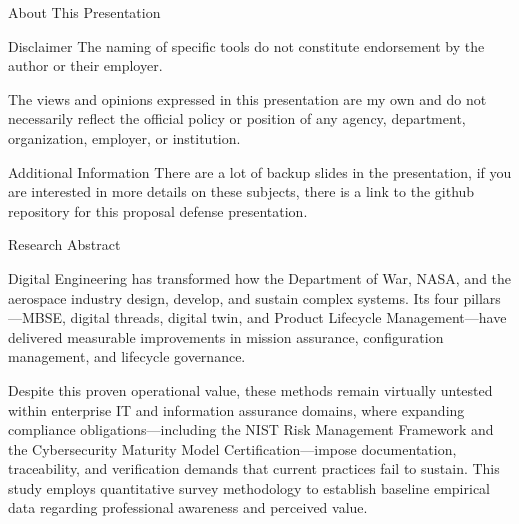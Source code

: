 \documentclass{beamer}
\begin{document}
\begin{frame}{About This Presentation}

  \begin{block}{Disclaimer}
    The naming of specific tools do not constitute endorsement by the author or their employer.

    \vspace{0.3cm}

    The views and opinions expressed in this presentation are my own and do not necessarily reflect the official policy or position of any agency, department, organization, employer, or institution.

  \end{block}
  \begin{block}{Additional Information}
    There are a lot of backup slides in the presentation, if you are interested in more details on these subjects, there is a link to the github repository for this proposal defense presentation.
  \end{block}
\end{frame}

\begin{frame}{Research Abstract}
  \begin{small}
    Digital Engineering has transformed how the Department of War, NASA, and the aerospace industry design, develop, and sustain complex systems. Its four pillars---MBSE, digital threads, digital twin, and Product Lifecycle Management---have delivered measurable improvements in mission assurance, configuration management, and lifecycle governance.

    \vspace{0.3cm}
    Despite this proven operational value, these methods remain virtually untested within enterprise IT and information assurance domains, where expanding compliance obligations---including the NIST Risk Management Framework and the Cybersecurity Maturity Model Certification---impose documentation, traceability, and verification demands that current practices fail to sustain. This study employs quantitative survey methodology to establish baseline empirical data regarding professional awareness and perceived value.
  \end{small}
\end{frame}
\end{document}
